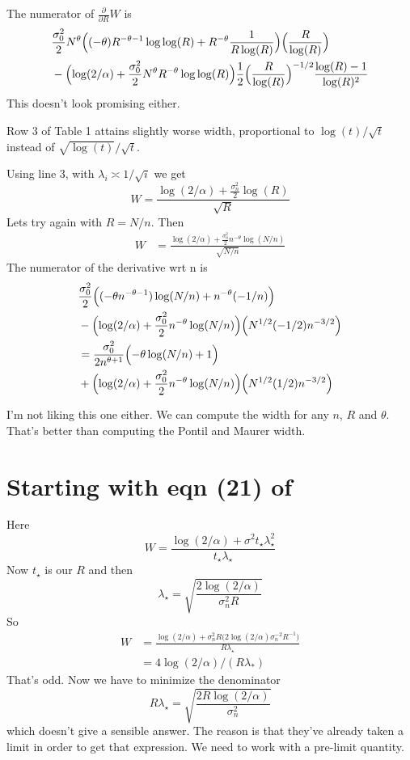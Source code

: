 \documentclass{article}
\newcommand{\art}[1]{\begingroup\color{blue}#1\endgroup}
\begin{document}
The numerator of $\frac\partial{\partial R}W$ is
\begin{align*}
&\frac{\sigma_0^2}2N^\theta \Bigl((-\theta)R^{-\theta-1}\log\log(R)
+R^{-\theta}\frac1{R\log(R)}
\Bigr)
\Bigl(\frac{R}{\log(R)}\Bigr)\\
&-\Bigl(\log(2/\alpha)+\frac{\sigma_0^2}2N^\theta R^{-\theta}\log\log(R)\Bigr)
\frac12\Bigl(\frac{R}{\log(R)}\Bigr)^{-1/2}\frac{\log(R)-1}{\log(R)^2}
\end{align*}
This doesn't look promising either.

Row 3 of Table 1 attains slightly worse width, 
proportional to $\log(t)/\sqrt{t}$ instead
of $\sqrt{\log(t)}/\sqrt{t}$.

Using line 3, with $\lambda_i\asymp 1/\sqrt{i}$ we get
$$W=
\frac{\log(2/\alpha)+\frac{\sigma_n^2}2\log(R)}{\sqrt{R}}
$$
Lets try again with $R=N/n$. Then
\begin{align*}W&=
\frac{\log(2/\alpha)+\frac{\sigma_0^2}2n^{-\theta}\log(N/n)}{\sqrt{N/n}}
\end{align*}
The numerator of the derivative wrt n is
\begin{align*}
&\frac{\sigma^2_0}2\Bigl((-\theta n^{-\theta-1})\log(N/n)
+n^{-\theta}(-1/n)\Bigr)\\
&-\Bigl(\log(2/\alpha)+\frac{\sigma_0^2}2n^{-\theta}\log(N/n)\Bigr)\Bigl(N^{1/2}(-1/2)n^{-3/2}\Bigr)\\
&=\frac{\sigma^2_0}{2n^{\theta+1}}\Bigl(-\theta\log(N/n)
+1\Bigr)\\
&+\Bigl(\log(2/\alpha)+\frac{\sigma_0^2}2n^{-\theta}\log(N/n)\Bigr)\Bigl(N^{1/2}(1/2)n^{-3/2}\Bigr)
\end{align*}

I'm not liking this one either.
We can compute the width for any $n$, $R$ and $\theta$.
That's better than computing the Pontil and Maurer width.


\section*{Starting with eqn (21) of \cite{WauRam24a}}

Here
$$
W = \frac{\log(2/\alpha)+\sigma^2t_\star\lambda_\star^2}{t_\star\lambda_\star}
$$
Now $t_\star$ is our $R$ and then
$$
\lambda_\star = \sqrt{\frac{2\log(2/\alpha)}{\sigma_n^2 R}}
$$
So
\begin{align*}
W &= \frac{\log(2/\alpha)+\sigma_n^2R
\bigl(2\log(2/\alpha)\sigma_n^{-2}R^{-1}\bigr)
}{R\lambda_\star}\\
&=4\log(2/\alpha)/(R\lambda_*)
\end{align*}
That's odd.  Now we have to minimize the denominator
$$
R\lambda_\star =  
\sqrt{\frac{2R\log(2/\alpha)}{\sigma_n^2}}
$$
which doesn't give a sensible answer.  
\art{The reason is that they've already taken a limit in 
order to get that expression. We need to work with a
pre-limit quantity.
}
\end{document}
